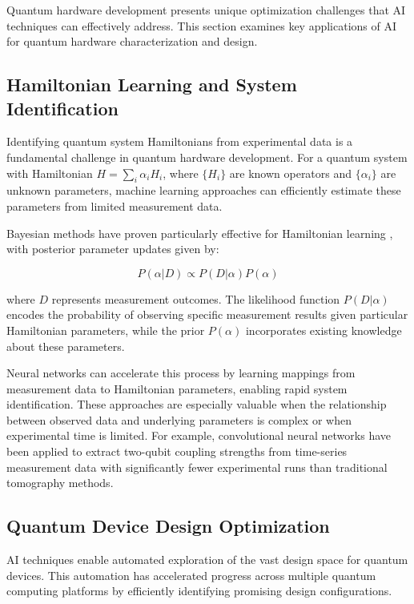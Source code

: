 Quantum hardware development presents unique optimization challenges that AI techniques can effectively address. This section examines key applications of AI for quantum hardware characterization and design.

\subsection{Hamiltonian Learning and System Identification}

Identifying quantum system Hamiltonians from experimental data is a fundamental challenge in quantum hardware development. For a quantum system with Hamiltonian $H = \sum_i \alpha_i H_i$, where $\{H_i\}$ are known operators and $\{\alpha_i\}$ are unknown parameters, machine learning approaches can efficiently estimate these parameters from limited measurement data.

Bayesian methods have proven particularly effective for Hamiltonian learning \cite{wiebe2014hamiltonian}, with posterior parameter updates given by:

\begin{equation}
P(\alpha | D) \propto P(D | \alpha) P(\alpha)
\end{equation}

where $D$ represents measurement outcomes. The likelihood function $P(D | \alpha)$ encodes the probability of observing specific measurement results given particular Hamiltonian parameters, while the prior $P(\alpha)$ incorporates existing knowledge about these parameters. 

Neural networks can accelerate this process by learning mappings from measurement data to Hamiltonian parameters, enabling rapid system identification. These approaches are especially valuable when the relationship between observed data and underlying parameters is complex or when experimental time is limited. For example, convolutional neural networks have been applied to extract two-qubit coupling strengths from time-series measurement data with significantly fewer experimental runs than traditional tomography methods.

\subsection{Quantum Device Design Optimization}

AI techniques enable automated exploration of the vast design space for quantum devices. This automation has accelerated progress across multiple quantum computing platforms by efficiently identifying promising design configurations.

